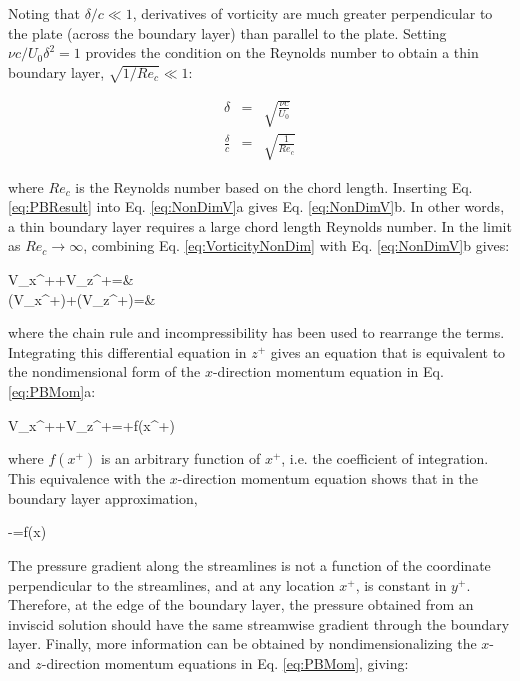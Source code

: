\documentclass[10pt]{article}
\numberwithin{equation}{section} %
\begin{document}
Noting that \(\delta/c\ll1\), derivatives of vorticity are much greater perpendicular to the plate (across the boundary layer) than parallel to the plate. Setting \(\nu c/U_0\delta^2=1\) provides the condition on the Reynolds number to obtain a thin boundary layer, \(\sqrt{1/Re_c}\ll 1\):

\begin{subequations}
\label{eq:PBResult}
\begin{eqnarray}
\delta&=&\sqrt{\frac{\nu c}{U_0}}\\
\frac{\delta}{c}&=&\sqrt{\frac{1}{Re_c}}
\end{eqnarray}
\end{subequations}

where \(Re_c\) is the Reynolds number based on the chord length. Inserting Eq. \eqref{eq:PBResult} into Eq. \eqref{eq:NonDimV}a gives Eq. \eqref{eq:NonDimV}b. In other words, a thin boundary layer requires a large chord length Reynolds number. In the limit as \(Re_c\rightarrow\infty\), combining Eq. \eqref{eq:VorticityNonDim} with Eq. \eqref{eq:NonDimV}b gives:

\beqa
V_x^++V_z^+=&\ \\
\left(V_x^+\right)+\left(V_z^+\right)=&\ 
\eeqa

where the chain rule and incompressibility has been used to rearrange the terms. Integrating this differential equation in \(z^+\) gives an equation that is equivalent to the nondimensional form of the \(x\)-direction momentum equation in Eq. \eqref{eq:PBMom}a:

\beq
V_x^++V_z^+=+f(x^+)
\eeq

where \(f(x^+)\) is an arbitrary function of \(x^+\), i.e. the coefficient of integration. This equivalence with the \(x\)-direction momentum equation shows that in the boundary layer approximation,

\beq
\label{eq:PGrad}
-=f(x)
\eeq

The pressure gradient along the streamlines is not a function of the coordinate perpendicular to the streamlines, and at any location \(x^+\), is constant in \(y^+\). Therefore, at the edge of the boundary layer, the pressure obtained from an inviscid solution should have the same streamwise gradient through the boundary layer. Finally, more information can be obtained by nondimensionalizing the \(x\)- and \(z\)-direction momentum equations in Eq. \eqref{eq:PBMom}, giving:
\end{document}
